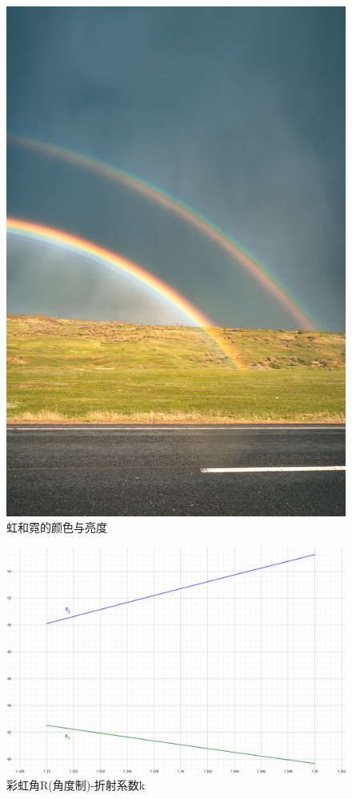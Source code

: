 \documentclass[a4paper]{article}%
\begin{document}
\begin{figure}[H]
   \centering
   \includegraphics[scale=0.09]{图7}
   \caption[图7]{虹和霓的颜色与亮度}\label{fig-图7}
   \end{figure}
     \begin{figure}[tp]
   \centering
   \includegraphics[scale=0.14]{微信图片_20221113175356}
   \caption[图6]{彩虹角R(角度制)-折射系数k}\label{fig-图6}
   \end{figure}
\nocite{*}

\end{document}
